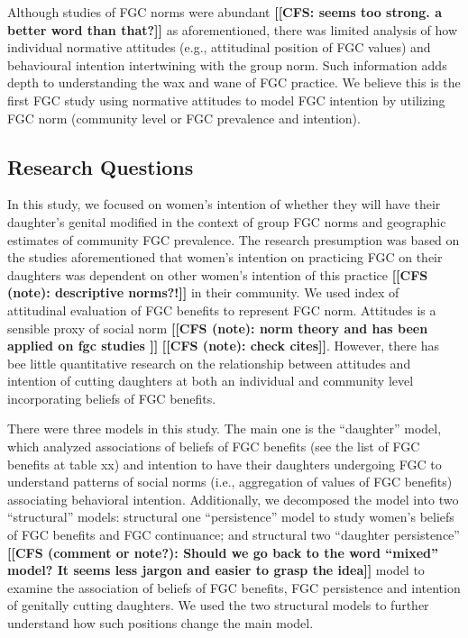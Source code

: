 \documentclass[12pt,]{article}
\newcommand{\comment}[1]{\textbf{[[#1]]}}
\newcommand{\cfcmt}[1]{\comment{CFS: #1}}
\newcommand{\cfonly}[1]{\comment{CFS (note): #1}}
\newcommand{\cf}[1]{\comment{CFS (comment or note?): #1}}
\begin{document}
Although studies of FGC norms were abundant \cfcmt{seems too strong. a better word than that?} as aforementioned, there was limited analysis of how individual normative attitudes (e.g., attitudinal position of FGC values) and behavioural intention intertwining with the group norm.  Such information adds depth to understanding the wax and wane of FGC practice.  We believe this is the first FGC study using normative attitudes to model FGC intention by utilizing FGC norm (community level or FGC prevalence and intention).

\subsection{Research Questions}\label{research-questions}

In this study, we focused on women’s intention of whether they will have their daughter’s genital modified in the context of group FGC norms and geographic estimates of community FGC prevalence.  The research presumption was based on the studies aforementioned that women’s intention on practicing FGC on their daughters was dependent on other women’s intention of this practice \cfonly{descriptive norms?!} in their community. We used index of attitudinal evaluation of FGC benefits to represent FGC norm.  Attitudes is a sensible proxy of social norm \cfonly {norm theory \cite{Ajze91, Ajze02, Bicc10, BiccMari15, Mack96, Mack00, MackLeJe08, RimaLapi15, Youn11} and has been applied on fgc studies \cite{CislHeis18, EffeVogt15, Harf06, ModrLiu13, PashPonn16, ShelHern06,}} \cfonly{check cites}.  However, there has bee little quantitative research on the relationship between attitudes and intention of cutting daughters at both an individual and community level incorporating beliefs of FGC benefits.

There were three models in this study.  The main one is the “daughter” model, which analyzed associations of beliefs of FGC benefits (see the list of FGC benefits at table xx) and intention to have their daughters undergoing FGC to understand patterns of social norms (i.e., aggregation of values of FGC benefits) associating behavioral intention.  Additionally, we decomposed the model into two “structural” models:  structural one “persistence” model to study women’s beliefs of FGC benefits and FGC continuance; and structural two “daughter persistence”  \cf{Should we go back to the word “mixed” model?  It seems less jargon and easier to grasp the idea} model to examine the association of beliefs of FGC benefits, FGC persistence and intention of genitally cutting daughters.  We used the two structural models to further understand how such positions change the main model.
\end{document}
